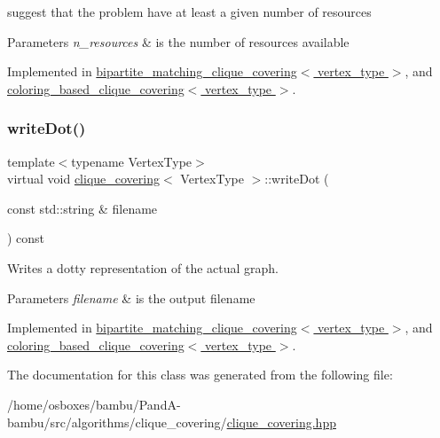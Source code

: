 suggest that the problem have at least a given number of resources 


\begin{DoxyParams}{Parameters}
{\em n\+\_\+resources} & is the number of resources available \\
\hline
\end{DoxyParams}


Implemented in \hyperlink{classbipartite__matching__clique__covering_a9404da13a622a47c62cecc9c4c9556d8}{bipartite\+\_\+matching\+\_\+clique\+\_\+covering$<$ vertex\+\_\+type $>$}, and \hyperlink{classcoloring__based__clique__covering_a37ef2c0e027bac18b114b98fd7e97519}{coloring\+\_\+based\+\_\+clique\+\_\+covering$<$ vertex\+\_\+type $>$}.

\mbox{\label{classclique__covering_a67c99c3f13f8a9400ae6e83d8bd31ba5}} 
\subsubsection{\texorpdfstring{write\+Dot()}{writeDot()}}
{\footnotesize\ttfamily template$<$typename Vertex\+Type$>$ \\
virtual void \hyperlink{classclique__covering}{clique\+\_\+covering}$<$ Vertex\+Type $>$\+::write\+Dot (\begin{DoxyParamCaption}\item[{const std\+::string \&}]{filename }\end{DoxyParamCaption}) const\hspace{0.3cm}{\ttfamily [pure virtual]}}



Writes a dotty representation of the actual graph. 


\begin{DoxyParams}{Parameters}
{\em filename} & is the output filename \\
\hline
\end{DoxyParams}


Implemented in \hyperlink{classbipartite__matching__clique__covering_a50c738b6d8386f57f09314859a9e417b}{bipartite\+\_\+matching\+\_\+clique\+\_\+covering$<$ vertex\+\_\+type $>$}, and \hyperlink{classcoloring__based__clique__covering_a6dfe0da70979e9851a95d247b9847c32}{coloring\+\_\+based\+\_\+clique\+\_\+covering$<$ vertex\+\_\+type $>$}.



The documentation for this class was generated from the following file\+:\begin{DoxyCompactItemize}
\item 
/home/osboxes/bambu/\+Pand\+A-\/bambu/src/algorithms/clique\+\_\+covering/\hyperlink{clique__covering_8hpp}{clique\+\_\+covering.\+hpp}\end{DoxyCompactItemize}
